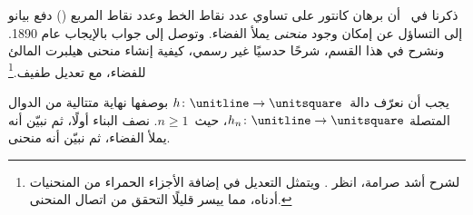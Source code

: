 \documentclass[../../../include/open-logic-section]{subfiles}
\begin{document}


ذكرنا في~ أن برهان كانتور على تساوي عدد نقاط
الخط وعدد نقاط المربع
() دفع بيانو إلى التساؤل
عن إمكان وجود \emph{منحنى} يملأ الفضاء. وتوصل إلى جواب بالإيجاب عام
1890. ونشرح في هذا القسم، شرحًا حدسيًا غير رسمي، كيفية إنشاء منحنى
هيلبرت المالئ للفضاء، مع تعديل طفيف.\footnote{لشرح أشد صرامة، انظر
\cite{Rose2010}. ويتمثل التعديل في إضافة الأجزاء الحمراء من المنحنيات
أدناه، مما ييسر قليلًا التحقق من اتصال المنحنى.}

يجب أن نعرّف دالة~$h \colon \unitline \to \unitsquare$ بوصفها نهاية
متتالية من الدوال المتصلة
$h_n \colon \unitline \to \unitsquare$، حيث~$n \geq 1$. نصف البناء
أولًا، ثم نبيّن أنه يملأ الفضاء، ثم نبيّن أنه منحنى.
\end{document}
